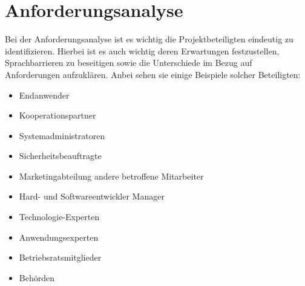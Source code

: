 \section{Anforderungsanalyse}
Bei der Anforderungsanalyse ist es wichtig die Projektbeteiligten eindeutig zu identifizieren. Hierbei ist es auch wichtig deren Erwartungen festzustellen, Sprachbarrieren zu beseitigen sowie die Unterschiede im Bezug auf Anforderungen aufzuklären. Anbei sehen sie einige Beispiele solcher Beteiligten:
\begin{itemize}
\item Endanwender
\item Kooperationspartner
\item Systemadministratoren
\item Sicherheitsbeauftragte
\item Marketingabteilung andere betroffene Mitarbeiter
\item Hard- und Softwareentwickler Manager
\item Technologie-Experten
\item Anwendungsexperten
\item Betriebsratsmitglieder
\item Behörden
\end{itemize}

